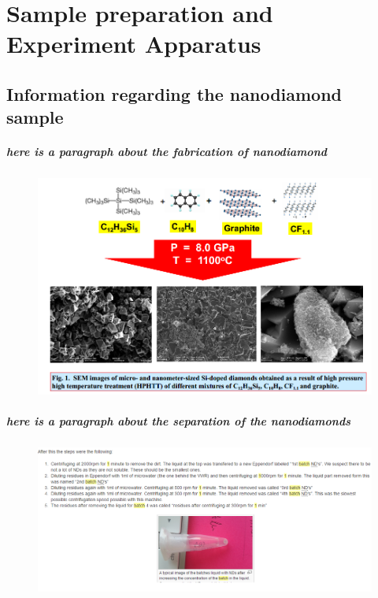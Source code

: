 \chapter[Experimental approach of surpressing the spectral diffusion]{Sample preparation and Experiment Apparatus} %

\label{Chapter2} %

\section{Information regarding the nanodiamond sample}

\paragraph{here is a paragraph about the fabrication of nanodiamond}
\FloatBarrier
\begin{figure}[h]
\centering
\includegraphics[width=0.7\linewidth]{Figures/pic/Unbenannt}
\caption{}
\label{fig:unbenannt}
\end{figure}
\FloatBarrier

\paragraph{here is a paragraph about the separation of the nanodiamonds}
\FloatBarrier
\begin{figure}[h]
\centering
\includegraphics[width=0.7\linewidth]{Figures/pic/Unbenannt1}
\caption{}
\label{fig:unbenannt1}
\end{figure}
\FloatBarrier
